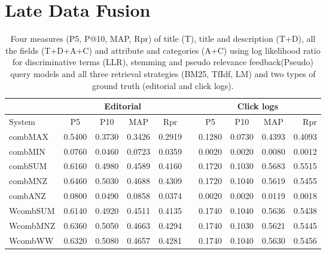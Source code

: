 \section{Late Data Fusion}

\begin{table}[H]
\begin{center}
\scriptsize
\caption{
Four measures (P\@5, P@10, MAP, Rpr) of title (T), title and description (T+D), all the fields (T+D+A+C) and attribute and categories (A+C) using log likelihood ratio for discriminative terms (LLR), stemming and pseudo relevance feedback(Pseudo) query models and all three retrieval strategies (BM25, TfIdf, LM) and two types of ground truth (editorial and click logs).}
\label{table:ldf}

\begin{tabular}{lccccccccr}
\toprule
 & \multicolumn{4}{c}{Editorial} & & \multicolumn{4}{c}{Click logs} \\
\midrule
System & P\@5 & P\@10 & MAP & Rpr &   & P\@5 & P\@10 & MAP & Rpr \\
\midrule
	combMAX & 0.5400 & 0.3730 & 0.3426 & 0.2919 &   & 0.1280 & 0.0730 & 0.4393 & 0.4093 \\
	combMIN & 0.0760 & 0.0460 & 0.0723 & 0.0359 &   & 0.0020 & 0.0020 & 0.0080 & 0.0012 \\
	combSUM & 0.6160 & 0.4980 & 0.4589 & 0.4160 &   & 0.1720 & 0.1030 & 0.5683 & 0.5515 \\
	combMNZ & 0.6460 & 0.5030 & 0.4688 & 0.4309 &   & 0.1720 & 0.1040 & 0.5619 & 0.5455 \\
	combANZ & 0.0800 & 0.0490 & 0.0858 & 0.0374 &   & 0.0020 & 0.0020 & 0.0119 & 0.0018 \\
	WcombSUM & 0.6140 & 0.4920 & 0.4511 & 0.4135 &   & 0.1740 & 0.1040 & 0.5636 & 0.5438 \\
	WcombMNZ & 0.6360 & 0.5050 & 0.4663 & 0.4294 &   & 0.1740 & 0.1030 & 0.5621 & 0.5445 \\
	WcombWW & 0.6320 & 0.5080 & 0.4657 & 0.4281 &   & 0.1740 & 0.1040 & 0.5630 & 0.5456 \\
\bottomrule
\end{tabular}
\end{center}
\end{table}


